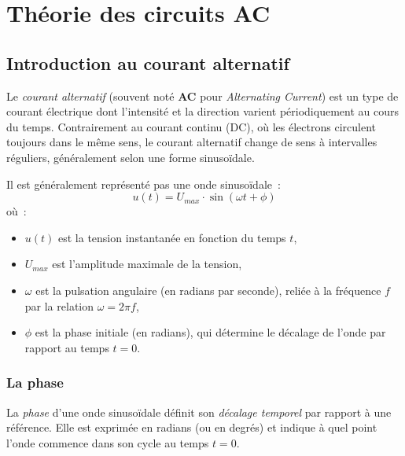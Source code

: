 \chapter{Th\'eorie des circuits AC} \label{subsec:ac_circuit_theory}

\section{Introduction au courant alternatif} \label{subsec:intro_ac}
Le \emph{courant alternatif} (souvent not\'e \textbf{AC} pour \emph{Alternating Current}) est un type de courant \'electrique dont l’intensit\'e et la direction varient p\'eriodiquement au cours du temps. Contrairement au courant continu (DC), où les \'electrons circulent toujours dans le m\^eme sens, le courant alternatif change de sens à intervalles r\'eguliers, g\'en\'eralement selon une forme sinuso\"idale.\par
Il est g\'en\'eralement repr\'esent\'e pas une onde sinuso\"idale~:
\[
    u(t) = U_{max} \cdot \sin(\omega t + \phi)
\]
o\`u~:
\begin{itemize}
    \item $u(t)$ est la tension instantan\'ee en fonction du temps $t$,
    \item $U_{max}$ est l'amplitude maximale de la tension,
    \item $\omega$ est la pulsation angulaire (en radians par seconde), reli\'ee à la fr\'equence $f$ par la relation $\omega = 2\pi f$,
    \item $\phi$ est la phase initiale (en radians), qui d\'etermine le d\'ecalage de l'onde par rapport au temps $t = 0$.
\end{itemize}

\subsection{La phase}
La \emph{phase} d'une onde sinuso\"idale d\'efinit son \emph{d\'ecalage temporel} par rapport à une r\'ef\'erence. Elle est exprim\'ee en radians (ou en degr\'es) et indique \`a quel point l'onde commence dans son cycle au temps $t = 0$.\par

